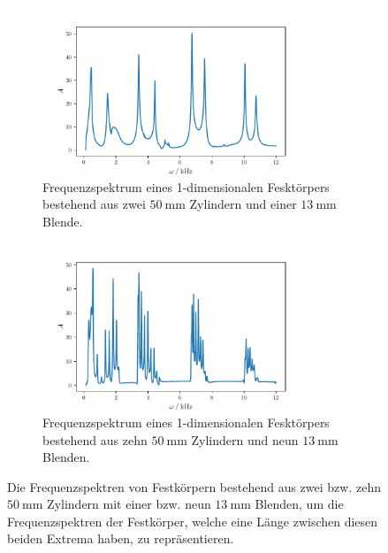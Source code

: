 \begin{figure}
    \begin{subfigure}{0.48\textwidth}%
    \centering%
    \includegraphics[height=5cm]{build/2c1b.pdf}%
    \caption{Frequenzspektrum eines 1-dimensionalen Fesktörpers bestehend aus zwei $\qty{50}{\milli\meter}$ Zylindern und einer $\qty{13}{\milli\meter}$ Blende.}%
    \label{fig:2c1b}%
    \end{subfigure}%
    \hfill%
    \begin{subfigure}{0.48\textwidth}%
    \centering%
    \includegraphics[height=5cm]{build/10c9b.pdf}%
    \caption{Frequenzspektrum eines 1-dimensionalen Fesktörpers bestehend aus zehn $\qty{50}{\milli\meter}$ Zylindern und neun $\qty{13}{\milli\meter}$ Blenden.}%
    \label{fig:2c1b}%
    \end{subfigure}%
    \caption{Die Frequenzspektren von Festkörpern bestehend aus zwei bzw. zehn $\qty{50}{\milli\meter}$ Zylindern mit einer bzw. neun $\qty{13}{\milli\meter}$ Blenden, um die 
    Frequenzspektren der Festkörper, welche eine Länge zwischen diesen beiden Extrema haben, zu repräsentieren.}%
    \label{fig:13mm}
\end{figure}%
